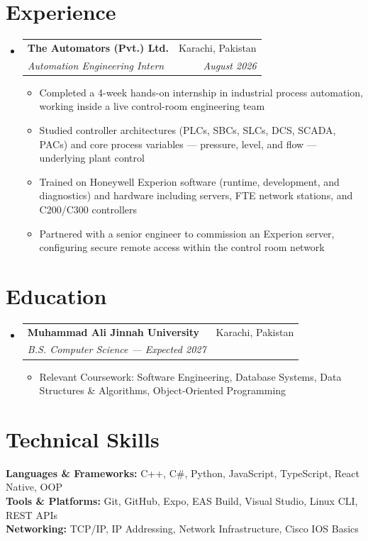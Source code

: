 \documentclass[letterpaper,11pt]{article}
\makeatletter
\newcommand{\resumeItem}[1]{
  \item\small{
    {#1}
  }
}
\newcommand{\resumeSubheading}[4]{
  \vspace{-1pt}\item
    \begin{tabular*}{0.97\textwidth}[t]{l@{\extracolsep{\fill}}r}
      \textbf{\color{navy}#1} & \color{slate}#2 \\
      \textit{\small#3} & \textit{\small\color{slate} #4} \\
    \end{tabular*}\vspace{-7pt}
}
\newcommand{\resumeSubHeadingListStart}{\begin{itemize}[leftmargin=0.15in, label={}, itemsep=-2pt, topsep=2pt]}
\newcommand{\resumeSubHeadingListEnd}{\end{itemize}}
\newcommand{\resumeItemListStart}{\begin{itemize}[leftmargin=0.15in, itemsep=1pt, topsep=1pt, parsep=0pt]}
\newcommand{\resumeItemListEnd}{\end{itemize}\vspace{-5pt}}
\makeatother
\begin{document}
\section{Experience}
  \resumeSubHeadingListStart
    \resumeSubheading
      {The Automators (Pvt.) Ltd.}{Karachi, Pakistan}
      {Automation Engineering Intern}{August 2026}
    \resumeItemListStart
        \resumeItem{Completed a 4-week hands-on internship in industrial process automation, working inside a live control-room engineering team}
        \resumeItem{Studied controller architectures (PLCs, SBCs, SLCs, DCS, SCADA, PACs) and core process variables — pressure, level, and flow — underlying plant control}
        \resumeItem{Trained on Honeywell Experion software (runtime, development, and diagnostics) and hardware including servers, FTE network stations, and C200/C300 controllers}
        \resumeItem{Partnered with a senior engineer to commission an Experion server, configuring secure remote access within the control room network}
    \resumeItemListEnd
  \resumeSubHeadingListEnd

\section{Education}
  \resumeSubHeadingListStart
    \resumeSubheading
      {Muhammad Ali Jinnah University}{Karachi, Pakistan}
      {B.S. Computer Science --- Expected 2027}{}
    \resumeItemListStart
        \resumeItem{Relevant Coursework: Software Engineering, Database Systems, Data Structures \& Algorithms, Object-Oriented Programming}
    \resumeItemListEnd
  \resumeSubHeadingListEnd

\section{Technical Skills}
 \begin{itemize}[leftmargin=0.15in, label={}]
    \small{\item{
     \textbf{\color{navy}Languages \& Frameworks:} C++, C\#, Python, JavaScript, TypeScript, React Native, OOP \\[2pt]
     \textbf{\color{navy}Tools \& Platforms:} Git, GitHub, Expo, EAS Build, Visual Studio, Linux CLI, REST APIs \\[2pt]
     \textbf{\color{navy}Networking:} TCP/IP, IP Addressing, Network Infrastructure, Cisco IOS Basics
    }}
 \end{itemize}
\end{document}
